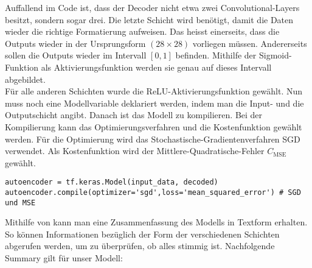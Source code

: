 Auffallend im Code ist, dass der Decoder nicht etwa zwei Convolutional-Layers
besitzt, sondern sogar drei. Die letzte Schicht wird benötigt, damit
die Daten wieder die richtige Formatierung aufweisen. Das heisst einerseits,
dass die Outputs wieder in der Ursprungsform $(28 \times 28)$ vorliegen müssen.
Andererseits sollen die Outputs wieder im Intervall
$[0,1]$ befinden. Mithilfe der Sigmoid-Funktion als Aktivierungsfunktion werden
sie genau auf dieses Intervall abgebildet. \\
Für alle anderen Schichten wurde die ReLU-Aktivierungsfunktion gewählt.
\para{}
Nun muss noch eine Modellvariable deklariert werden, indem man die Input-  und
die Outputschicht  angibt.
Danach ist das Modell zu kompilieren. Bei der Kompilierung kann das
Optimierungsverfahren und die Kostenfunktion gewählt werden. Für die Optimierung
wird das Stochastische-Gradientenverfahren SGD verwendet.
Als Kostenfunktion wird der Mittlere-Quadratische-Fehler $C_{\text{MSE}}$ gewählt.
\begin{verbatim}
autoencoder = tf.keras.Model(input_data, decoded)
autoencoder.compile(optimizer='sgd',loss='mean_squared_error') # SGD und MSE
\end{verbatim}
Mithilfe von  kann man eine Zusammenfassung des
Modells in Textform erhalten. So können Informationen bezüglich der Form der
verschiedenen Schichten abgerufen werden, um zu überprüfen, ob alles stimmig ist.
Nachfolgende Summary gilt für unser Modell:
